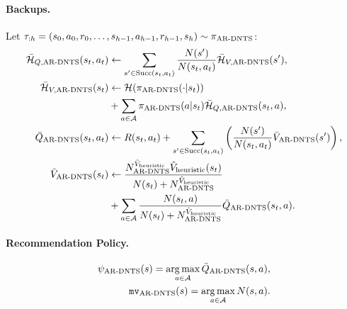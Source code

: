     \paragraph{Backups.}
        Let $\tau_{:h}=(s_0,a_0,r_0,\ldots,s_{h-1},a_{h-1},r_{h-1},s_h)\sim\piardents$:
        \begin{align}
            \HQardents(s_t,a_t) &\leftarrow \sum_{s'\in \suc{s_t}{a_t}} \frac{N(s')}{N(s_t,a_t)} \HVardents(s'), \\
            \HVardents(s_t) &\leftarrow \cl{H}(\piardents(\cdot | s_t)) \nonumber \\
                &+ \sum_{a\in\cl{A}} \piardents(a|s_t)\HQardents(s_t,a), \\
            \Qardents(s_t,a_t) &\leftarrow 
                R(s_t,a_t) + \sum_{s' \in \suc{s_t}{a_t}} \left( \frac{N(s')}{N(s_t,a_t)} \Vardents(s') \right),  \\ 
            \Vardents(s_t) &\leftarrow \frac{\Nvardents \Vinit(s_t)}{N(s_t)+\Nvardents} \nonumber \\
                &+ \sum_{a\in\cl{A}} \frac{N(s_t,a)}{N(s_t)+\Nvardents} \Qardents(s_t,a).
        \end{align}

    \paragraph{Recommendation Policy.}
        \begin{align}
            \psiardents(s)=\argmax_{a\in\cl{A}}\Qardents(s,a),  \\
            \mvardents(s) = \argmax_{a\in\cl{A}} N(s,a). 
        \end{align}
























